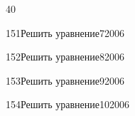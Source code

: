\begin{TrigSourcePage}{40}
\begin{TrigExercise}{151}{Решить уравнение}{7}{2006}
\end{TrigExercise}
\begin{TrigExercise}{152}{Решить уравнение}{8}{2006}
\end{TrigExercise}
\begin{TrigExercise}{153}{Решить уравнение}{9}{2006}
\end{TrigExercise}
\begin{TrigExercise}{154}{Решить уравнение}{10}{2006}
\end{TrigExercise}
\end{TrigSourcePage}

